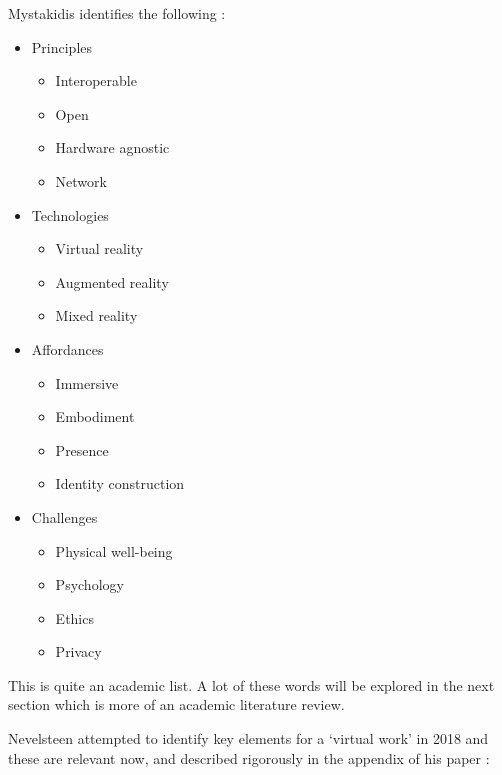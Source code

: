 Mystakidis identifies the following \cite{mystakidis2022metaverse}:
\begin{itemize}
\item Principles
\begin{itemize}
\item Interoperable
\item Open
\item Hardware agnostic
\item Network
\end{itemize}
\item Technologies
\begin{itemize}
\item Virtual reality
\item Augmented reality
\item Mixed reality
\end{itemize}
\item Affordances
\begin{itemize}
\item Immersive
\item Embodiment
\item Presence
\item Identity construction
\end{itemize}
\item Challenges
\begin{itemize}
\item Physical well-being
\item Psychology
\item Ethics
\item Privacy
\end{itemize}
\end{itemize}
This is quite an academic list. A lot of these words will be explored in the next section which is more of an academic literature review.\par
Nevelsteen attempted to identify key elements for a `virtual work' in 2018 and these are relevant now, and described rigorously in the appendix of his paper \cite{nevelsteen2018virtual}:
